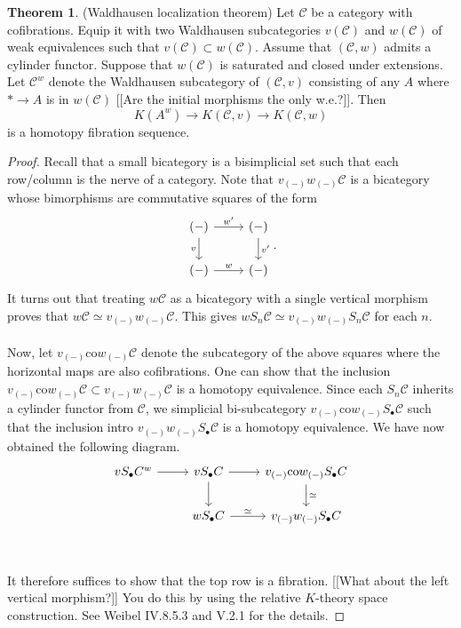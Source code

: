 \documentclass[10pt,letterpaper,cm]{nupset}
\theoremstyle{definition}
\newtheorem{theorem}{Theorem}
\newcommand{\1}{\mathbf{1}}
\renewcommand{\c}{\mathscr{C}}
\newcommand{\0}{\vec 0}
\begin{document}
\begin{theorem}{(Waldhausen localization theorem)}
Let $\c$ be a category with cofibrations. Equip it with two Waldhausen subcategories $v(\c)$ and $w(\c)$ of weak equivalences such that $v(\c) \subset w(\c)$. Assume that $(\c, w)$ admits a cylinder functor. Suppose that $w(\c)$ is saturated and closed under extensions. Let $\c^w$ denote the Waldhausen subcategory of $(\c, v)$ consisting of any $A$ where $\ast \to A$ is in $w(\c)$ {[[Are the initial morphisms the only w.e.?]]}. Then $$ K(A^w) \to K(\c, v) \to K(\c, w) $$ is a homotopy fibration sequence.
\end{theorem}
\begin{proof}
Recall that a small bicategory is a bisimplicial set such that each row/column is the nerve of a category. Note that $v_{(-)}w_{(-)}\c$ is a bicategory whose bimorphisms are commutative squares of the form
\[
\begin{tikzcd}
(-) \arrow[r, "w'"] \arrow[d, "v"'] & (-) \arrow[d, "v'"] \\
(-) \arrow[r, "w"] & (-)
\end{tikzcd}.
\]
It turns out that treating $w \c$ as a bicategory with a single vertical morphism proves that $w \c \simeq v_{(-)}w_{(-)}\c$. This gives $wS_n \c \simeq v_{(-)}w_{(-)}S_n\c$ for each $n$.
\\ \\ Now, let $v_{(-)}\text{co}w_{(-)}\c$ denote the subcategory of the above squares where the horizontal maps are also cofibrations. One can show that the inclusion $v_{(-)}\text{co}w_{(-)}\c \subset v_{(-)}w_{(-)}\c$ is a homotopy equivalence. Since each $S_n \c$ inherits a cylinder functor from $\c$, we simplicial bi-subcategory $v_{(-)}\text{co}w_{(-)}S_{\bullet}\c$ such that the inclusion intro $v_{(-)}w_{(-)}S_{\bullet}\c$ is a homotopy equivalence. We have now obtained the following diagram.
\[
\begin{tikzcd}
vS_{\bullet}C^w \arrow[r] & vS_{\bullet}C \arrow[r] \arrow[d] & v_{(-)}\text{co}w_{(-)}S_{\bullet}C \arrow[d, "\simeq"] \\
 & wS_{\bullet}C \arrow[r, "\simeq"] & v_{(-)}w_{(-)}S_{\bullet}C
\end{tikzcd}
\]
\\ \\ It therefore suffices to show that the top row is a fibration. {[[What about the left vertical morphism?]]} You do this by using the relative $K$-theory space construction. See Weibel IV.8.5.3 and V.2.1 for the details.
\end{proof}
\end{document}
